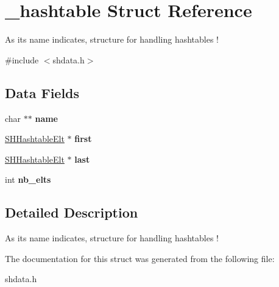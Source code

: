 \hypertarget{struct__hashtable}{\section{\-\_\-hashtable Struct Reference}
\label{struct__hashtable}
}


As its name indicates, structure for handling hashtables !  




{\ttfamily \#include $<$shdata.\-h$>$}

\subsection*{Data Fields}
\begin{DoxyCompactItemize}
\item 
\hypertarget{struct__hashtable_a42306111ecd5284bcec721e421e36d82}{char $\ast$$\ast$ {\bfseries name}}\label{struct__hashtable_a42306111ecd5284bcec721e421e36d82}

\item 
\hypertarget{struct__hashtable_a3c9a4e2eeb4e2d1c14830c75702cb33a}{\hyperlink{struct__hashtable__elt}{S\-H\-Hashtable\-Elt} $\ast$ {\bfseries first}}\label{struct__hashtable_a3c9a4e2eeb4e2d1c14830c75702cb33a}

\item 
\hypertarget{struct__hashtable_a84cf43ffbbf51a2e6875c057f925f874}{\hyperlink{struct__hashtable__elt}{S\-H\-Hashtable\-Elt} $\ast$ {\bfseries last}}\label{struct__hashtable_a84cf43ffbbf51a2e6875c057f925f874}

\item 
\hypertarget{struct__hashtable_a19546463f1f097345f2057103d4b90fd}{int {\bfseries nb\-\_\-elts}}\label{struct__hashtable_a19546463f1f097345f2057103d4b90fd}

\end{DoxyCompactItemize}


\subsection{Detailed Description}
As its name indicates, structure for handling hashtables ! 

The documentation for this struct was generated from the following file\-:\begin{DoxyCompactItemize}
\item 
shdata.\-h\end{DoxyCompactItemize}
